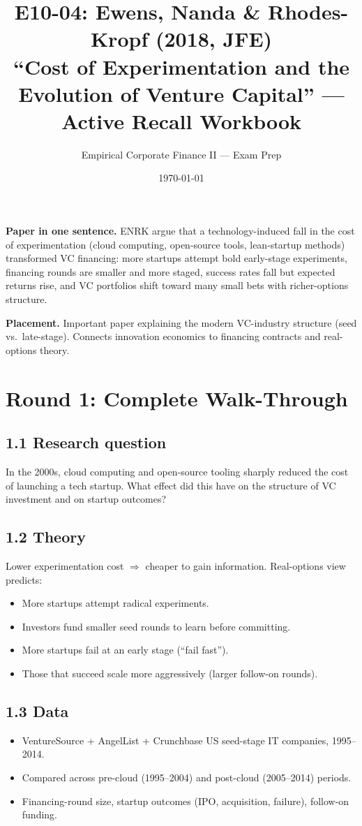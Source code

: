 \documentclass[11pt]{article}
\title{E10-04: Ewens, Nanda \& Rhodes-Kropf (2018, JFE) \\
\large ``Cost of Experimentation and the Evolution of Venture Capital'' --- Active Recall Workbook}
\author{Empirical Corporate Finance II --- Exam Prep}
\date{\today}
\begin{document}
\maketitle

\begin{keybox}
\textbf{Paper in one sentence.} ENRK argue that a technology-induced fall in the cost of experimentation (cloud computing, open-source tools, lean-startup methods) transformed VC financing: more startups attempt bold early-stage experiments, financing rounds are smaller and more staged, success rates fall but expected returns rise, and VC portfolios shift toward many small bets with richer-options structure.

\textbf{Placement.} Important paper explaining the modern VC-industry structure (seed vs.\ late-stage). Connects innovation economics to financing contracts and real-options theory.
\end{keybox}

\section*{Round 1: Complete Walk-Through}

\subsection*{1.1 Research question}
In the 2000s, cloud computing and open-source tooling sharply reduced the cost of launching a tech startup. What effect did this have on the structure of VC investment and on startup outcomes?

\subsection*{1.2 Theory}
Lower experimentation cost $\Rightarrow$ cheaper to gain information. Real-options view predicts:
\begin{itemize}
\item More startups attempt radical experiments.
\item Investors fund smaller seed rounds to learn before committing.
\item More startups fail at an early stage (``fail fast'').
\item Those that succeed scale more aggressively (larger follow-on rounds).
\end{itemize}

\subsection*{1.3 Data}
\begin{itemize}
\item VentureSource + AngelList + Crunchbase US seed-stage IT companies, 1995--2014.
\item Compared across pre-cloud (1995--2004) and post-cloud (2005--2014) periods.
\item Financing-round size, startup outcomes (IPO, acquisition, failure), follow-on funding.
\end{itemize}
\end{document}
